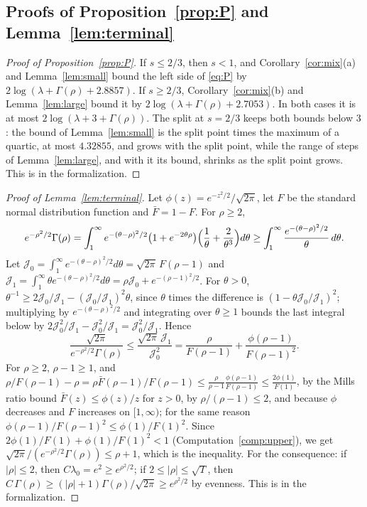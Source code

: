 \documentclass[12pt]{amsart}
\theoremstyle{definition}
\numberwithin{equation}{section}
\begin{document}
\subsection{Proofs of Proposition~\ref{prop:P} and Lemma~\ref{lem:terminal}}\label{subsec:proofP}

\begin{proof}[Proof of Proposition~\ref{prop:P}]
If $s\le2/3$, then $s<1$, and Corollary~\ref{cor:mix}(a) and Lemma~\ref{lem:small} bound the left side of \eqref{eq:P} by $2\log(\lambda+\Gamma(\rho)+2.8857)$. If $s\ge2/3$, Corollary~\ref{cor:mix}(b) and Lemma~\ref{lem:large} bound it by $2\log(\lambda+\Gamma(\rho)+2.7053)$. In both cases it is at most $2\log(\lambda+3+\Gamma(\rho))$. The split at $s=2/3$ keeps both bounds below $3$: the bound of Lemma~\ref{lem:small} is the split point times the maximum of a quartic, at most $4.32855$, and grows with the split point, while the range of steps of Lemma~\ref{lem:large}, and with it its bound, shrinks as the split point grows. This is  in the formalization.
\end{proof}

\begin{proof}[Proof of Lemma~\ref{lem:terminal}]
Let $\phi(z)=e^{-z^2/2}/\sqrt{2\pi}$, let $F$ be the standard normal distribution function and $\bar F=1-F$. For $\rho\ge2$,
\[
e^{-\rho^2/2}\Gamma(\rho)=\int_1^\infty e^{-(\theta-\rho)^2/2}\bigl(1+e^{-2\theta\rho}\bigr)\Bigl(\frac1\theta+\frac2{\theta^3}\Bigr)d\theta\ge\int_1^\infty\frac{e^{-(\theta-\rho)^2/2}}\theta\,d\theta .
\]
Let $\mathcal J_0=\int_1^\infty e^{-(\theta-\rho)^2/2}d\theta=\sqrt{2\pi}\,F(\rho-1)$ and $\mathcal J_1=\int_1^\infty\theta e^{-(\theta-\rho)^2/2}d\theta=\rho \mathcal J_0+e^{-(\rho-1)^2/2}$. For $\theta>0$, $\theta^{-1}\ge2\mathcal J_0/\mathcal J_1-(\mathcal J_0/\mathcal J_1)^2\theta$, since $\theta$ times the difference is $(1-\theta \mathcal J_0/\mathcal J_1)^2$; multiplying by $e^{-(\theta-\rho)^2/2}$ and integrating over $\theta\ge1$ bounds the last integral below by $2\mathcal J_0^2/\mathcal J_1-\mathcal J_0^2/\mathcal J_1=\mathcal J_0^2/\mathcal J_1$. Hence
\[
\frac{\sqrt{2\pi}}{e^{-\rho^2/2}\Gamma(\rho)}\le\frac{\sqrt{2\pi}\,\mathcal J_1}{\mathcal J_0^2}=\frac{\rho}{F(\rho-1)}+\frac{\phi(\rho-1)}{F(\rho-1)^2}.
\]
For $\rho\ge2$, $\rho-1\ge1$, and $\rho/F(\rho-1)-\rho=\rho\bar F(\rho-1)/F(\rho-1)\le\frac{\rho}{\rho-1}\frac{\phi(\rho-1)}{F(\rho-1)}\le\frac{2\phi(1)}{F(1)}$, by the Mills ratio bound $\bar F(z)\le\phi(z)/z$ for $z>0$, by $\rho/(\rho-1)\le2$, and because $\phi$ decreases and $F$ increases on $[1,\infty)$; for the same reason $\phi(\rho-1)/F(\rho-1)^2\le\phi(1)/F(1)^2$. Since $2\phi(1)/F(1)+\phi(1)/F(1)^2<1$ (Computation~\ref{comp:upper}), we get $\sqrt{2\pi}/(e^{-\rho^2/2}\Gamma(\rho))\le\rho+1$, which is the inequality. For the consequence: if $|\rho|\le2$, then $C\lambda_0=e^2\ge e^{\rho^2/2}$; if $2\le|\rho|\le\sqrt T$, then $C\,\Gamma(\rho)\ge(|\rho|+1)\Gamma(\rho)/\sqrt{2\pi}\ge e^{\rho^2/2}$ by evenness. This is  in the formalization.
\end{proof}
\end{document}

